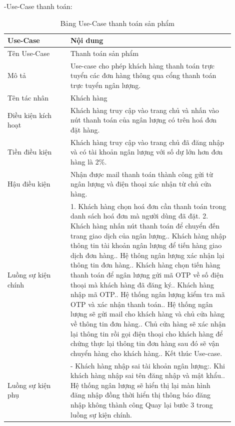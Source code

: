 -Use-Case thanh toán:
\begin{longtable}[htp]{ |m{0.25\linewidth}|m{0.65\linewidth}|}
 \caption{Bảng Use-Case thanh toán sản phẩm \label{long}}\\
 \hline
 Use-Case & Nội dung \\
 \hline
 Tên Use-Case & Thanh toán sản phẩm \\
 \hline
 Mô tả & Use-case cho phép khách hàng thanh toán trực tuyển các đơn hàng thông qua cổng thanh toán trực tuyển ngân lượng.\\
 \hline
 Tên tác nhân & Khách hàng\\
 \hline
 Điều kiện kích hoạt & Khách hàng truy cập vào trang chủ và nhấn vào nút thanh toán của ngân lượng có trên hoá đơn đặt hàng.\\
 \hline
 Tiền điều kiện & Khách hàng truy cập vào trang chủ đã đăng nhập và có tài khoản ngân lượng với số dự lớn hơn đơn hàng là 2\%.\\
 \hline
 Hậu điều kiện & Nhận được mail thanh toán thành công gửi từ ngân lượng và điện thoại xác nhận từ chủ cửa hàng.\\
 \hline
 Luồng sự kiện chính & 
  1. Khách hàng chọn hoá đơn cần thanh toán trong danh sách hoá đơn mà người dùng đã đặt.
  2. Khách hàng nhấn nút thanh toán để chuyển đến trang giao dịch của ngân lượng.\newline
  3. Khách hàng nhập thông tin tài khoản ngân lượng để tiến hàng giao dịch đơn hàng.\newline
  4. Hệ thông ngân lượng xác nhận lại thông tin đơn hàng.\newline
  5. Khách hàng chọn tiến hàng thanh toán để ngân lượng gửi mã OTP về số điện thoại mà khách hàng đã đăng ký.\newline
  6. Khách hàng nhập mã OTP.\newline 
  7. Hệ thống ngân lượng kiểm tra mã OTP và xác nhận thanh toán.\newline 
  8. Hệ thống ngân lượng sẽ gửi mail cho khách hàng và chủ cửa hàng về thông tin đơn hàng.\newline 
  9. Chủ cửa hàng sẽ xác nhận lại thông tin rồi gọi điện thoại cho khách hàng để chứng thực lại thông tin đơn hàng sau đó sẽ vận chuyển hàng cho khách hàng.\newline 
  5. Kết thúc Use-case.	\newline 
 \\
 \hline
 Luồng sự kiện phụ & 
 - Khách hàng nhập sai tài khoản ngân lượng:\newline
 1. Khi khách hàng nhập sai tên đăng nhập và mật khẩu.\newline
 2. Hệ thống ngân lượng sẽ hiển thị lại màn hình đăng nhập đồng thời hiển thị thông báo đăng nhập không thành công 
  Quay lại bước 3 trong luồng sự kiện chính.
 \\
 \hline
\end{longtable}
\newpage

